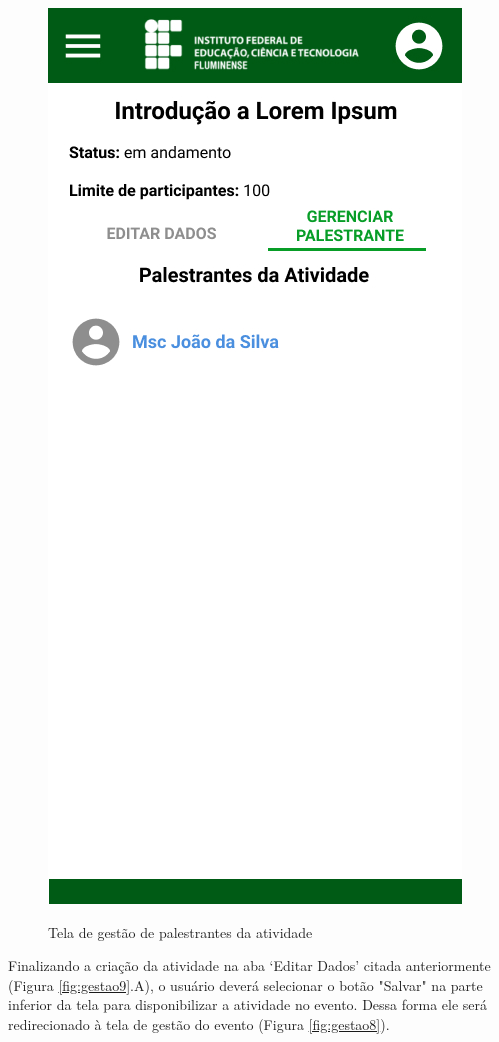 \begin{figure}[H]
    \centering
    \caption{Tela de gestão de palestrantes da atividade}
    \includegraphics[scale=0.44]{figuras/Gestao/11-GestaoPalestrantes.jpg}
    \label{fig:gestao11}
\end{figure}

Finalizando a criação da atividade na aba ‘Editar Dados’ citada anteriormente (Figura \ref{fig:gestao9}.A), o usuário deverá selecionar o botão "Salvar" na parte inferior da tela para disponibilizar a atividade no evento. Dessa forma ele será redirecionado à tela de gestão do evento (Figura \ref{fig:gestao8}).

